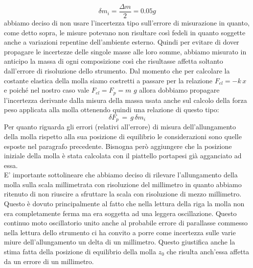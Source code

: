 \begin{equation*}
	\delta m_i = \frac{\Delta m}{2} = 0.05 g 
\end{equation*}
abbiamo deciso di non usare l'incertezza tipo sull'errore di misurazione in quanto, come detto sopra, le misure potevano non risultare così fedeli in quanto soggette anche a variazioni repentine dell'ambiente esterno.
Quindi per evitare di dover propagare le incertezze delle singole masse alle loro somme, abbiamo misurato in anticipo la massa di ogni composizione così che risultasse affetta soltanto dall'errore di risoluzione dello strumento.
Dal momento che per calcolare la costante elastica della molla siamo costretti a passare per la relazione $F_{el} = -k\,x$ e poiché nel nostro caso vale $F_{el} = F_{p} = m\,\,g$ allora dobbiamo propagare l'incertezza derivante dalla misura della massa usata anche sul calcolo della forza peso applicata alla molla ottenendo quindi una relazione di questo tipo:
\begin{equation*}
	\delta F_{p}\, =\, g\,\delta m_i
\end{equation*}
Per quanto riguarda gli errori (relativi all'errore) di misura dell'allungamento della molla rispetto alla sua posizione di equilibrio le considerazioni sono quelle esposte nel paragrafo precedente. Bisnogna però aggiungere che la posizione iniziale della molla è stata calcolata con il piattello portapesi già agganciato ad essa.\\
E' importante sottolineare che abbiamo deciso di rilevare l'allungamento della molla sulla scala millimetrata con risoluzione del millimetro in quanto abbiamo ritenuto di non riuscire a sfruttare la scala con risoluzione di mezzo millimetro. Questo è dovuto principalmente al fatto che nella lettura della riga la molla non era completamente ferma ma era soggetta ad una leggera oscillazione. Questo continuo moto oscillatorio unito anche al probabile errore di parallasse commesso nella lettura dello strumento ci ha convito a porre come incertezza sulle varie miure dell'allungamento un delta di un millimetro. Questo giustifica anche la stima fatta della posizione di equilibrio della molla $z_0$ che risulta anch'essa affetta da un errore di un millimetro.

